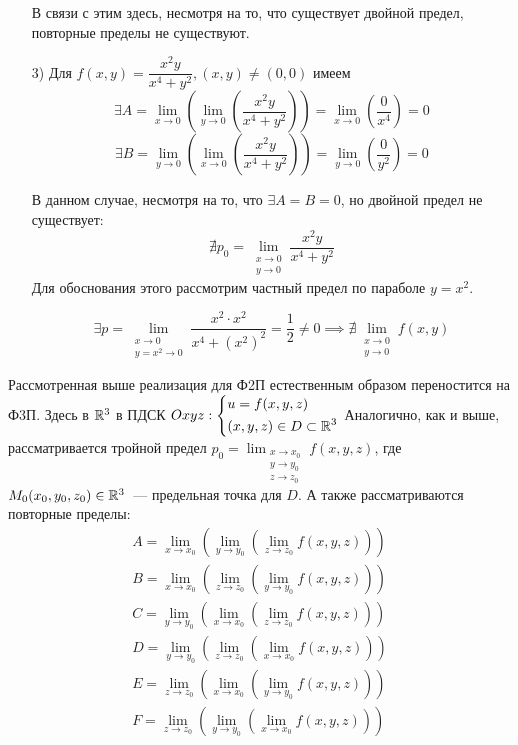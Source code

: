 \documentclass[../../main.tex]{subfiles}
\begin{document}
\begin{exmps}
\begin{itemize}
	В связи с этим здесь, несмотря на то, что существует двойной
	предел, повторные пределы не существуют.
	
	\item[3)] Для $f(x, y) = \dfrac{x^2 y}{x^4 + y^2}, (x, y) \ne (0, 0)$
	имеем \[\exists A = \displaystyle \lim_{x \to 0}
	{\left(\lim_{y \to 0}{\left( \dfrac{x^2 y}{x^4 + y^2} \right)}\right)} =
	\lim_{x \to 0}{\left(\dfrac{0}{x^4}\right)} = 0\]
	\[\exists B = \displaystyle \lim_{y \to 0}
	{\left(\lim_{x \to 0}{\left( \dfrac{x^2 y}{x^4 + y^2} \right)}\right)} =
	\lim_{y \to 0}{\left(\dfrac{0}{y^2}\right)} = 0\]
	
	В данном случае, несмотря на то, что $\exists A = B = 0$, но
	двойной предел не существует:
	\[\nexists p_0 = 
	\lim_{\substack{x \to 0 \\ y \to 0}}{\dfrac{x^2 y}{x^4 + y^2}}\]	
	Для обоснования этого рассмотрим частный предел по параболе
	$y = x^2$.
	
	\[\exists p = \lim_{\substack{x \to 0 \\ y = x^2 \to 0}}
	{\dfrac{x^2 \cdot x^2}{x^4 + (x^2)^2}} = \dfrac{1}{2} \ne 0
	\implies \nexists \lim_{\substack{x \to 0 \\ y \to 0}}{f(x, y)}\]
\end{itemize}
\end{exmps}

Рассмотренная выше реализация для Ф2П естественным образом
переностится на Ф3П. Здесь в $\mathbb{R}^3$ в ПДСК $Oxyz:
\left\{\begin{aligned}
	&u = f(x, y, z) \\
	&(x, y, z) \in D \subset \mathbb{R}^3	\end{aligned}\right.$
	Аналогично, как и выше, рассматривается тройной предел
	$p_0 = \displaystyle \lim_{\substack{x \to x_0 \\ y \to y_0 \\ z \to z_0}}
{f(x, y, z)}$, где $M_0(x_0, y_0, z_0) \in \mathbb{R}^3$~--- предельная точка для $D$.
А также рассматриваются повторные пределы:
\begin{gather*}
	A = \lim_{x \to x_0}{(\lim_{y \to y_0}{(\lim_{z \to z_0}{f(x, y, z)})})} \\
	B = \lim_{x \to x_0}{(\lim_{z \to z_0}{(\lim_{y \to y_0}{f(x, y, z)})})} \\
	C = \lim_{y \to y_0}{(\lim_{x \to x_0}{(\lim_{z \to z_0}{f(x, y, z)})})} \\
	D = \lim_{y \to y_0}{(\lim_{z \to z_0}{(\lim_{x \to x_0}{f(x, y, z)})})} \\
	E = \lim_{z \to z_0}{(\lim_{x \to x_0}{(\lim_{y \to y_0}{f(x, y, z)})})} \\
	F = \lim_{z \to z_0}{(\lim_{y \to y_0}{(\lim_{x \to x_0}{f(x, y, z)})})}
\end{gather*}
	
\end{document}
